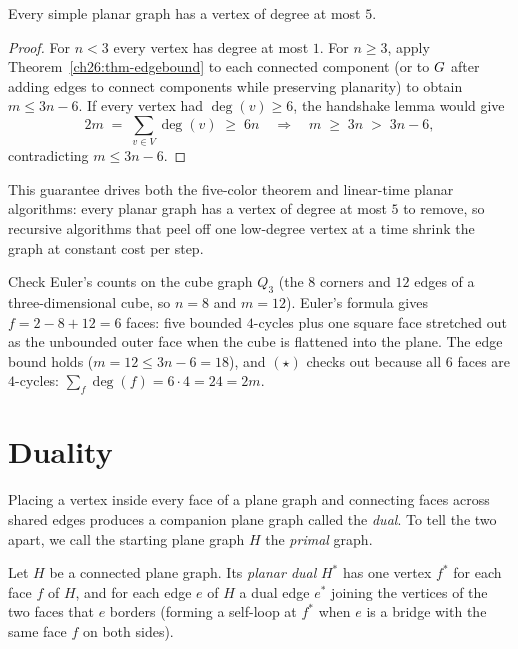\begin{corollary}
\label{ch26:cor-degree5}
Every simple planar graph has a vertex of degree at most $5$.
\end{corollary}

\begin{proof}
For $n < 3$ every vertex has degree at most $1$. For $n \ge 3$, apply
Theorem~\ref{ch26:thm-edgebound} to each connected component (or to $G$ after adding
edges to connect components while preserving planarity) to obtain $m \le 3n - 6$. If every
vertex had $\deg(v) \ge 6$, the handshake lemma would give
\[
  2m \;=\; \sum_{v \in V} \deg(v) \;\ge\; 6n \quad\Longrightarrow\quad m \;\ge\; 3n \;>\; 3n - 6,
\]
contradicting $m \le 3n - 6$.
\end{proof}

This guarantee drives both the five-color theorem and linear-time planar algorithms: every
planar graph has a vertex of degree at most $5$ to remove, so recursive algorithms that
peel off one low-degree vertex at a time shrink the graph at constant cost per step.

\begin{labbox}
Check Euler's counts on the cube graph $Q_3$ (the $8$ corners and $12$ edges of a
three-dimensional cube, so $n=8$ and $m=12$). Euler's formula gives
$f = 2 - 8 + 12 = 6$ faces: five bounded $4$-cycles plus one square face stretched out as
the unbounded outer face when the cube is flattened into the plane. The edge bound holds
($m = 12 \le 3n-6 = 18$), and $(\star)$ checks out because all $6$ faces are $4$-cycles:
$\sum_f\deg(f) = 6\cdot 4 = 24 = 2m$.
\end{labbox}

\section{Duality}
\label{ch26:duality}

Placing a vertex inside every face of a plane graph and connecting faces across shared
edges produces a companion plane graph called the \emph{dual}. To tell the two apart, we
call the starting plane graph $H$ the \emph{primal} graph.

\begin{definition}
\label{ch26:def-dual}
Let $H$ be a connected plane graph. Its \emph{planar dual} $H^\ast$ has one vertex $f^\ast$
for each face $f$ of $H$, and for each edge $e$ of $H$ a dual edge $e^\ast$ joining the
vertices of the two faces that $e$ borders (forming a self-loop at $f^\ast$ when $e$ is a
bridge with the same face $f$ on both sides).
\end{definition}

